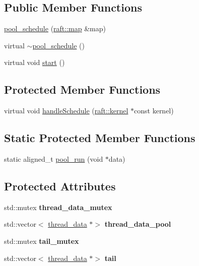 \subsection*{Public Member Functions}
\begin{DoxyCompactItemize}
\item 
\hyperlink{classpool__schedule_ab5d4103fd0a752a1a8207dbef883edb8}{pool\+\_\+schedule} (\hyperlink{classraft_1_1map}{raft\+::map} \&map)
\item 
virtual \hyperlink{classpool__schedule_a7185ae96c790733a14b7446826c07d9a}{$\sim$pool\+\_\+schedule} ()
\item 
virtual void \hyperlink{classpool__schedule_a9dd6194fd47fd0b12d2b62dcc57e38c2}{start} ()
\end{DoxyCompactItemize}
\subsection*{Protected Member Functions}
\begin{DoxyCompactItemize}
\item 
virtual void \hyperlink{classpool__schedule_afc614a83c6cddc28dc6fae01f6333b90}{handle\+Schedule} (\hyperlink{classraft_1_1kernel}{raft\+::kernel} $\ast$const kernel)
\end{DoxyCompactItemize}
\subsection*{Static Protected Member Functions}
\begin{DoxyCompactItemize}
\item 
static aligned\+\_\+t \hyperlink{classpool__schedule_a41aa8262dfd682963f25fbfb27d0cf35}{pool\+\_\+run} (void $\ast$data)
\end{DoxyCompactItemize}
\subsection*{Protected Attributes}
\begin{DoxyCompactItemize}
\item 
\hypertarget{classpool__schedule_a97e1366c47176a6c437bd8fee62f6a84}{}\label{classpool__schedule_a97e1366c47176a6c437bd8fee62f6a84} 
std\+::mutex {\bfseries thread\+\_\+data\+\_\+mutex}
\item 
\hypertarget{classpool__schedule_a62736a9716a7659278797545684609a7}{}\label{classpool__schedule_a62736a9716a7659278797545684609a7} 
std\+::vector$<$ \hyperlink{structpool__schedule_1_1thread__data}{thread\+\_\+data} $\ast$$>$ {\bfseries thread\+\_\+data\+\_\+pool}
\item 
\hypertarget{classpool__schedule_ac7cf999777805ffc3cf9e34c373e5844}{}\label{classpool__schedule_ac7cf999777805ffc3cf9e34c373e5844} 
std\+::mutex {\bfseries tail\+\_\+mutex}
\item 
\hypertarget{classpool__schedule_a53117b0850ff5231a892d6b0f664b693}{}\label{classpool__schedule_a53117b0850ff5231a892d6b0f664b693} 
std\+::vector$<$ \hyperlink{structpool__schedule_1_1thread__data}{thread\+\_\+data} $\ast$$>$ {\bfseries tail}
\end{DoxyCompactItemize}
